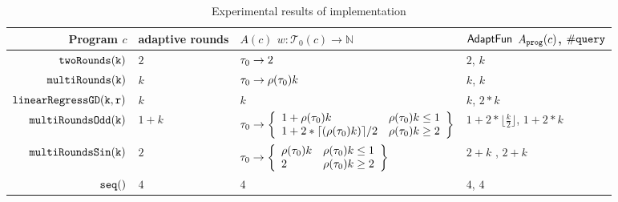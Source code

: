 \begin {table}[H]
    \caption{Experimental results of {\THESYSTEM} implementation}
        \label{tb:adapt-imp}
        \begin{center}
        \centering
{\footnotesize
        \begin{tabular}{ r | p{12mm} | p{60mm} | p{30mm}}
         Program $c$ & adaptive \newline rounds & $A(c)$ \newline $w: \mathcal{T}_0(c) \to \mathbb{N}$ & $\textsf{AdaptFun}$ \newline $A_{\mathtt{prog}}(c)$, $\# {\tt query}$ \\ 
         \hline
         \hline
         $  \mathtt{twoRounds(k)}$ & $2$ & $\mathtt{\tau}_0 \to 2$ & $2$, $k$ \\
         $  \mathtt{multiRounds(k)}$ & $k$ & $\mathtt{\tau}_0 \to \rho(\mathtt{\tau}_0) k$ & $k$, $k$  \\
         $  \mathtt{linearRegressGD(k, r)}$ & $k$ & $k$ & $k$, $2 * k$  \\
         $  \mathtt{multiRoundsOdd(k)}$ & $1 + k$ 
                                    & $
                                        \trace_0 \to 
                                        \left\{\begin{array}{ll}
                                        1 + \env(\trace_0) k & \env(\trace_0) k  \leq 1 \\
                                        1 + 2 * \lceil{(\env(\trace_0) k)} \rceil / 2 & \env(\trace_0) k \geq 2
                                        \end{array}\right\}
                                        $ 
              & $1 +2 * \lfloor \frac{k}{2} \rfloor$, $1 + 2*k$  \\
         $  \mathtt{multiRoundsSin(k)}$    & $2$ 
                                            & $
                                                \trace_0 \to 
                                                \left\{\begin{array}{ll}
                                                \env(\trace_0) k & \env(\trace_0) k  \leq 1 \\
                                                2 & \env(\trace_0) k \geq 2
                                                \end{array}\right\}
                                                $ 
                                            & $2 + k$ , $2 + k$  \\
         $\mathtt{seq()}$ & $4$ & $4$ & $4$, $4$  \\ 

\end{tabular}}
\end{center}
\end{table}
